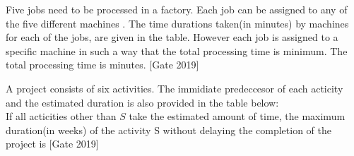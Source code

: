 	\item Five jobs  need to be processed in a factory. Each job can be assigned to any of the five different machines . The time durations taken(in minutes) by machines for each of the jobs, are given in the table. However each job is assigned to a specific machine in such a way that the total processing time is minimum. The total processing time is \underline{\hspace{2cm}} minutes.
			\hfill{[Gate 2019]}
	\item A project consists of six activities. The immidiate predeccesor of each acticity and the estimated duration is also provided in the table below:\\
			
	If all acticities other than $S$ take the estimated amount of time, the maximum duration(in weeks) of the activity S without delaying the completion of the project is \underline{\hspace{2cm}}\hfill{[Gate 2019]}



